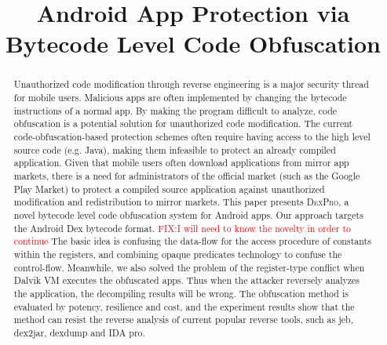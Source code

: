 \documentclass{sig-alternate-05-2015}
\newcommand\FIXME[1]{\textcolor{red}{FIX:}\textcolor{red}{#1}}
\newcommand{\ToolName}{\textsc{DexPro}\xspace}
\begin{document}
\title{Android App Protection via Bytecode Level Code Obfuscation}
\author{}

\maketitle

\begin{abstract}

Unauthorized code modification through reverse engineering is a major
security thread for mobile users. Malicious apps are often implemented
by changing the bytecode instructions of a normal app. By making the program
difficult to analyze, code obfuscation is a potential solution for unauthorized code modification. 
The current code-obfuscation-based protection schemes often require having access to the high level
source code (e.g. Java), making them infeasible to protect an already
compiled application.  Given that mobile
users often download applications from mirror app markets, there is a need
for administrators of the official market (such as the Google Play Market) to
protect a compiled source application against unauthorized modification and
redistribution to mirror markets.
This paper presents \ToolName, a novel bytecode level code obfuscation system for Android apps. Our approach targets the Android Dex bytecode format.
\FIXME{I will need to know the novelty in order to continue}
The basic idea is confusing
the data-flow for the access procedure of constants within the registers, and
combining opaque predicates technology to confuse the control-flow.
Meanwhile, we also solved the problem of the register-type conflict when
Dalvik VM executes the obfuscated apps. Thus when the attacker reversely
analyzes the application, the decompiling results will be wrong. The
obfuscation method is evaluated by potency, resilience and cost, and the
experiment results show that the method can resist the reverse analysis of
current popular reverse tools, such as jeb, dex2jar, dexdump and IDA pro.
\end{abstract}
\end{document}
